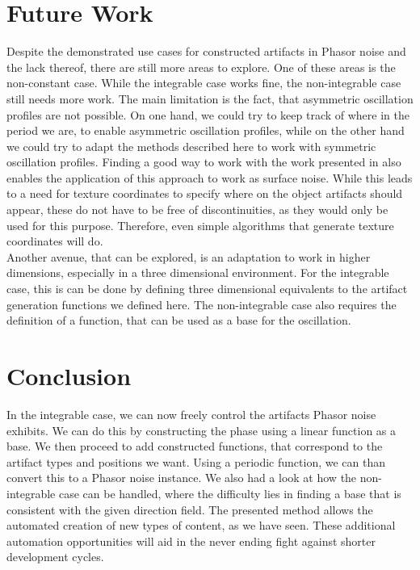 \documentclass{utue} %
\begin{document}
\section{Future Work}
Despite the demonstrated use cases for constructed artifacts in Phasor noise and the lack thereof, there are still more areas to explore. One of these areas is the non-constant case. While the integrable case works fine, the non-integrable case still needs more work. The main limitation is the fact, that asymmetric oscillation profiles are not possible. On one hand, we could try to keep track of where in the period we are, to enable asymmetric oscillation profiles, while on the other hand we could try to adapt the methods described here to work with symmetric oscillation profiles. Finding a good way to work with the work presented in \cite{stripes} also enables the application of this approach to work as surface noise. While this leads to a need for texture coordinates to specify where on the object artifacts should appear, these do not have to be free of discontinuities, as they would only be used for this purpose. Therefore, even simple algorithms that generate texture coordinates will do.\\
Another avenue, that can be explored, is an adaptation to work in higher dimensions, especially in a three dimensional environment. For the integrable case, this is can be done by defining three dimensional equivalents to the artifact generation functions we defined here. The non-integrable case also requires the definition of a function, that can be used as a base for the oscillation.

\section{Conclusion}
In the integrable case, we can now freely control the artifacts Phasor noise exhibits. We can do this by constructing the phase using a linear function as a base. We then proceed to add constructed functions, that correspond to the artifact types and positions we want. Using a periodic function, we can than convert this to a Phasor noise instance. We also had a look at how the non-integrable case can be handled, where the difficulty lies in finding a base that is consistent with the given direction field. The presented method allows the automated creation of new types of content, as we have seen. These additional automation opportunities will aid in the never ending fight against shorter development cycles.


\FloatBarrier
\printbibliography
\end{document}
